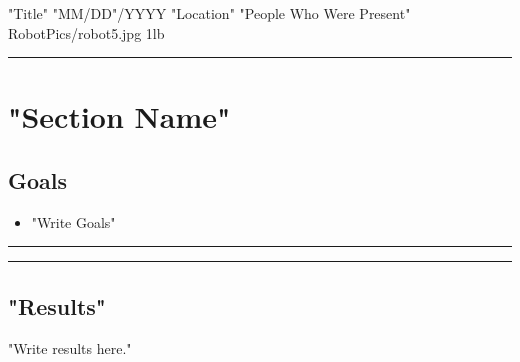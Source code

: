 
\insertmeeting 
	{"Title"} 
	{"MM/DD"/YYYY}
	{"Location"}
	{"People Who Were Present"}
	{RobotPics/robot5.jpg}%
	{1lb}
	



\noindent\hfil\rule{\textwidth}{.4pt}\hfil
\section{"Section Name"}
\subsection*{Goals}
\begin{itemize}
	\item "Write Goals" 
\end{itemize} 

\noindent\hfil\rule{\textwidth}{.4pt}\hfil


\noindent\hfil\rule{\textwidth}{.4pt}\hfil
\subsection*{"Results"}
	"Write results here." 



